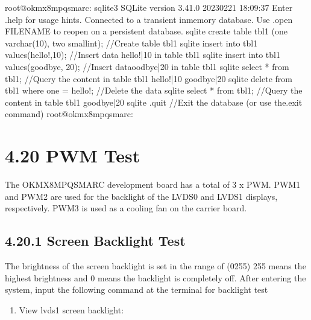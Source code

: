\documentclass[letterpaper,10pt,openany,english]{sphinxmanual}
\begin{document}
\begin{sphinxVerbatim}[commandchars=\\\{\}]
root@ok\PYGZhy{}mx8mpq\PYGZhy{}smarc:\PYGZti{}\PYGZsh{} sqlite3
SQLite version 3.41.0 2023\PYGZhy{}02\PYGZhy{}21 18:09:37
Enter \PYGZdq{}.help\PYGZdq{} for usage hints.
Connected to a transient in\PYGZhy{}memory database.
Use \PYGZdq{}.open FILENAME\PYGZdq{} to reopen on a persistent database.
sqlite\PYGZgt{} create table tbl1 (one varchar(10), two smallint);         //Create table tbl1
sqlite\PYGZgt{} insert into tbl1 values(\PYGZsq{}hello!\PYGZsq{},10);                      //Insert data hello!|10 in table tbl1 
sqlite\PYGZgt{} insert into tbl1 values(\PYGZsq{}goodbye\PYGZsq{}, 20);                  //Insert dataoodbye|20 in table tbl1
sqlite\PYGZgt{} select * from tbl1;                                   //Query the content in table tbl1
hello!|10
goodbye|20
sqlite\PYGZgt{} delete from tbl1 where one = \PYGZsq{}hello!\PYGZsq{};                  //Delete the data
sqlite\PYGZgt{} select * from tbl1;                                   //Query the content in table tbl1
goodbye|20
sqlite\PYGZgt{} .quit 			                                     //Exit the database (or use the.exit command)
root@ok\PYGZhy{}mx8mpq\PYGZhy{}smarc:\PYGZti{}\PYGZsh{}
\end{sphinxVerbatim}


\section{4.20 PWM Test}
\label{\detokenize{linux-manual:pwm-test}}
\sphinxAtStartPar
The OK\sphinxhyphen{}MX8MPQ\sphinxhyphen{}SMARC development board has a total of 3 x PWM. PWM1 and PWM2 are used for the backlight of the LVDS0 and LVDS1 displays, respectively. PWM3 is used as a cooling fan on the carrier board.


\subsection{4.20.1 Screen Backlight Test}
\label{\detokenize{linux-manual:screen-backlight-test}}
\sphinxAtStartPar
The brightness of the screen backlight is set in the range of (0\sphinxhyphen{}255) 255 means the highest brightness and 0 means the backlight is completely off. After entering the system, input the following command at the terminal for backlight test
\begin{enumerate}
%
\item {} 
\sphinxAtStartPar
View lvds1 screen backlight:

\end{enumerate}
\end{document}
